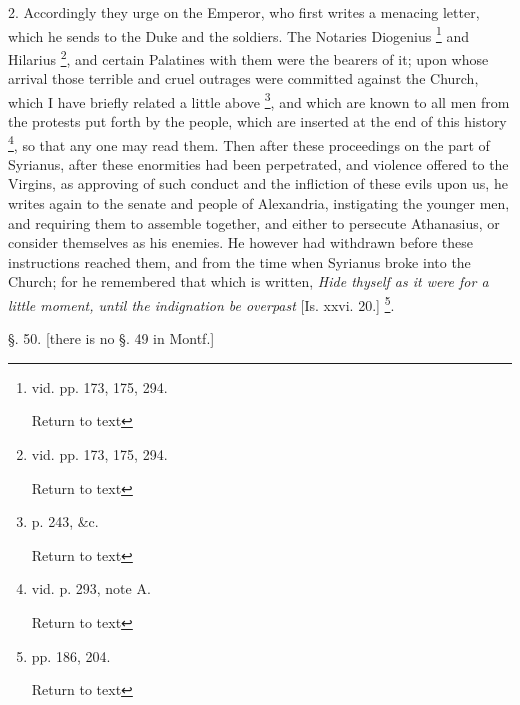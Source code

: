 2. Accordingly they urge on the Emperor, who
first writes a menacing letter, which he sends to the Duke and the
soldiers. The Notaries Diogenius \footnote{vid. pp. 173, 175, 294.

Return to text} and Hilarius \footnote{vid. pp. 173, 175, 294.

Return to text}, and
certain Palatines with them were the bearers of it; upon whose arrival
those terrible and cruel outrages were committed against the Church,
which I have briefly related a little above \footnote{p. 243, \&c.

Return to text}, and which are
known to all men from the protests put forth by the people, which are
inserted at the end of this history \footnote{vid. p. 293, note A.

Return to text}, so that any one may read
them. Then after these proceedings on the part of Syrianus, after
these enormities had been perpetrated, and violence offered to the
Virgins, as approving of such conduct and the infliction of these
evils upon us, he writes again to the senate and people of Alexandria,
instigating the younger men, and requiring them to assemble together,
and either to persecute Athanasius, or consider themselves as his
enemies. He however had withdrawn before these instructions reached
them, and from the time when Syrianus broke into the Church; for he
remembered that which is written, \emph{Hide thyself as it were for a
little moment, until the indignation be overpast} [Is. xxvi. 20.] \footnote{pp. 186, 204.

Return to text}.

§. 50. [there is no §. 49 in Montf.]

